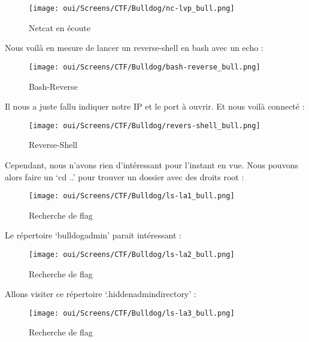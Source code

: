 \begin{figure}[htp!]
  \centering
  \setlength\figureheight{7cm}
  \setlength\figurewidth{9cm}
  \texttt{[image: oui/Screens/CTF/Bulldog/nc-lvp\_bull.png]}
  \caption{Netcat en écoute}
  \label{fig:courbe-tikz}
\end{figure}

\newpage
Nous voilà en mesure de lancer un reverse-shell en bash avec un echo :

\begin{figure}[htp!]
  \centering
  \setlength\figureheight{7cm}
  \setlength\figurewidth{9cm}
  \texttt{[image: oui/Screens/CTF/Bulldog/bash-reverse\_bull.png]}
  \caption{Bash-Reverse}
  \label{fig:courbe-tikz}
\end{figure}

Il nous a juste fallu indiquer notre IP et le port à ouvrir.
Et nous voilà connecté :

\begin{figure}[htp!]
  \centering
  \setlength\figureheight{7cm}
  \setlength\figurewidth{9cm}
  \texttt{[image: oui/Screens/CTF/Bulldog/revers-shell\_bull.png]}
  \caption{Reverse-Shell}
  \label{fig:courbe-tikz}
\end{figure}

Cependant, nous n’avons rien d’intéressant pour l’instant en vue. Nous pouvons alors faire un ‘cd ..’ pour trouver un dossier avec des droits root :

\begin{figure}[htp!]
  \centering
  \setlength\figureheight{7cm}
  \setlength\figurewidth{9cm}
  \texttt{[image: oui/Screens/CTF/Bulldog/ls-la1\_bull.png]}
  \caption{Recherche de flag}
  \label{fig:courbe-tikz}
\end{figure}

\newpage
Le répertoire ‘bulldogadmin’ parait intéressant :

\begin{figure}[htp!]
  \centering
  \setlength\figureheight{7cm}
  \setlength\figurewidth{9cm}
  \texttt{[image: oui/Screens/CTF/Bulldog/ls-la2\_bull.png]}
  \caption{Recherche de flag}
  \label{fig:courbe-tikz}
\end{figure}

Allons visiter ce répertoire ‘.hiddenadmindirectory’ :

\begin{figure}[htp!]
  \centering
  \setlength\figureheight{7cm}
  \setlength\figurewidth{9cm}
  \texttt{[image: oui/Screens/CTF/Bulldog/ls-la3\_bull.png]}
  \caption{Recherche de flag}
  \label{fig:courbe-tikz}
\end{figure}

